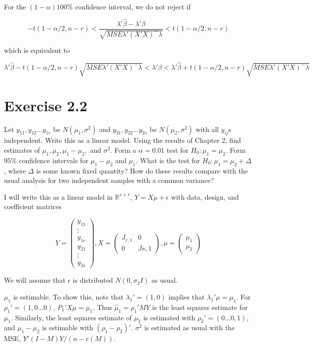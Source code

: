 \documentclass{article}
\newcommand{\R}{\mathbb{R}}
\begin{document}
For the $(1-\alpha)100\%$ confidence interval, we do not reject if

\[
-t(1-\alpha/2, n-r) < \frac{\lambda'\hat{\beta} - \lambda'\beta}{
\sqrt{MSE\lambda'(X'X)^-\lambda}
} < t(1-\alpha/2, n-r)
\]

which is equivalent to

\[
\lambda'\hat{\beta} - t(1-\alpha/2, n-r)\sqrt{MSE\lambda'(X'X)^-\lambda} < \lambda'\beta < \lambda'\hat{\beta} + t(1-\alpha/2, n-r)\sqrt{MSE\lambda'(X'X)^-\lambda}
\]

\section*{Exercise 2.2}
Let $y_{11}, y_{12} \dots y_{1r}$ be $N(\mu_1, \sigma^2)$ and $y_{21}, y_{22} \dots y_{2s}$ be $N(\mu_2, \sigma^2)$ with all $y_{ij}$s independent. Write this as a linear model. Using the results of Chapter 2, find estimates of $\mu_1, \mu_2, \mu_1-\mu_2,$ and $\sigma^2$. Form a $\alpha = 0.01$ test for $H_0:\mu_1 = \mu_2$. Form $95\%$ confidence intervals for $\mu_1-\mu_2$ and $\mu_1$. What is the test for $H_0: \mu_1 = \mu_2 + \Delta$, where $\Delta$ is some known fixed quantity? How do these results compare with the usual analysis for two independent samples with a common variance?

I will write this as a linear model in $\R^{s+r}$, $Y=X\mu + \epsilon$ with data, design, and coefficient matrices

\[
Y = \begin{pmatrix}
y_{11} \\
\vdots \\
y_{1r} \\
y_{21} \\
\vdots \\
y_{2s}
\end{pmatrix},
X = \begin{pmatrix}
J_{r,1} & 0 \\
0 & J{s, 1}
\end{pmatrix},
\mu = \begin{pmatrix}
\mu_1 \\ \mu_2
\end{pmatrix}
\]

We will assume that $\epsilon$ is distributed $N(0, \sigma_2I)$ as usual.

$\mu_1$ is estimable. To show this, note that $\lambda_1' = (1, 0)$ implies that $\lambda_1' \mu = \mu_1$. For $\rho_1' = (1, 0 \dots 0)$, $P_1'X\mu = \mu_1$. Thus $\hat{\mu}_1 = \rho_1'MY$ is the least squares estimate for $\mu_1$. Similarly, the least squares estimate of $\mu_2$ is estimated with $\rho_2' = (0 \dots 0, 1)$, and $\mu_1 - \mu_2$ is estimable with $(\rho_1 - \rho_2)'$. $\sigma^2$ is estimated as usual with the MSE, $Y'(I-M)Y/(n-r(M))$.
\end{document}
